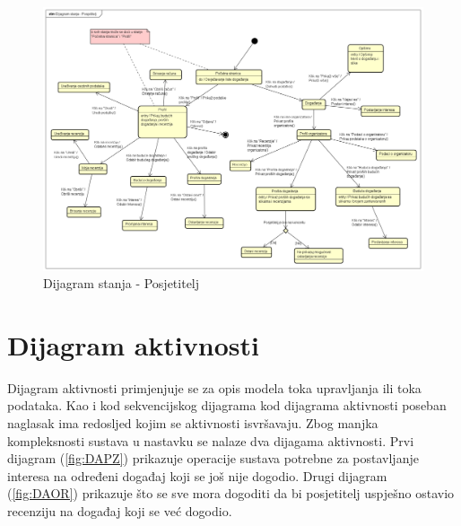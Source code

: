 			\begin{figure}[H]
			\includegraphics[width=\textwidth]{slike/Dijagram stanja - Posjetitelj.PNG} %
			\caption{Dijagram stanja - Posjetitelj}
			\label{fig:DSP} %
		\end{figure}
			
			
			\eject 
		
		\section{Dijagram aktivnosti}
		
			Dijagram aktivnosti primjenjuje se za opis modela toka upravljanja ili toka podataka. Kao i kod sekvencijskog dijagrama kod dijagrama aktivnosti poseban naglasak ima redosljed kojim se aktivnosti isvršavaju. Zbog manjka kompleksnosti sustava u nastavku se nalaze dva dijagama aktivnosti. Prvi dijagram (\ref{fig:DAPZ}) prikazuje operacije sustava potrebne za postavljanje interesa na određeni događaj koji se još nije dogodio. Drugi dijagram (\ref{fig:DAOR}) prikazuje što se sve mora dogoditi da bi posjetitelj uspješno ostavio recenziju na događaj koji se već dogodio. 
			
